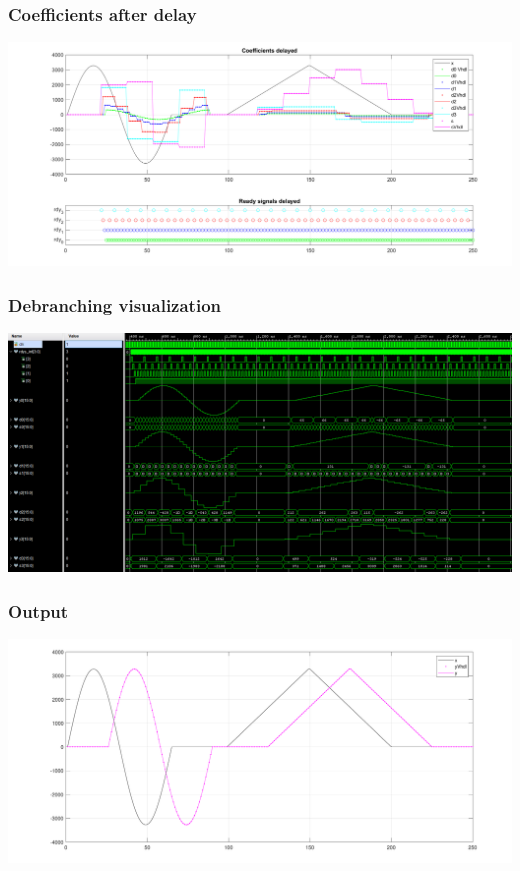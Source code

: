 \documentclass[english, aspectratio=169]{beamer}
\begin{document}
\begin{frame}
\frametitle{Coefficients after delay}
	\centering
	\includegraphics[scale=0.42]{coefs_delayed.pdf}
\end{frame}

\begin{frame}
\frametitle{Debranching visualization}
\centering
\includegraphics[width=\linewidth]{inv_branching_screenshot.PNG}
\end{frame}

\begin{frame}
\frametitle{Output}
	\centering
	\includegraphics[scale=0.42]{output.pdf}
\end{frame}
\end{document}
